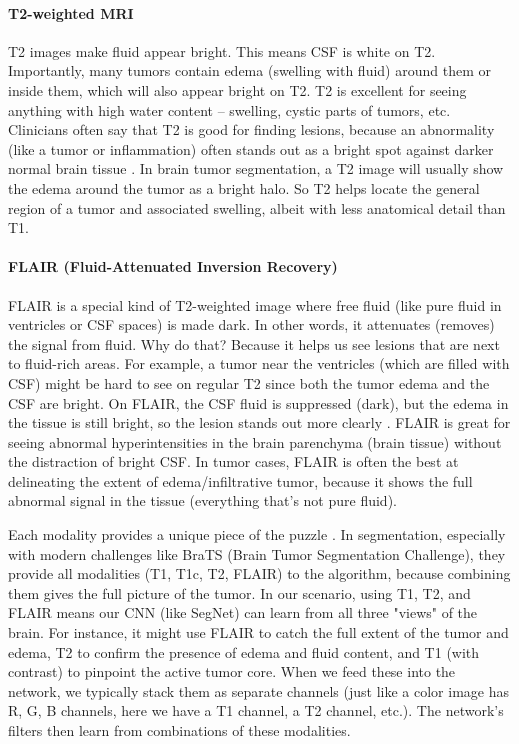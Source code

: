\paragraph{T2-weighted MRI}
T2 images make fluid appear bright. This means CSF is white on T2. Importantly, many tumors contain edema (swelling with fluid) around them or inside them, which will also appear bright on T2. T2 is excellent for seeing anything with high water content – swelling, cystic parts of tumors, etc. Clinicians often say that T2 is good for finding lesions, because an abnormality (like a tumor or inflammation) often stands out as a bright spot against darker normal brain tissue \cite{researchgate2023modalities}. In brain tumor segmentation, a T2 image will usually show the edema around the tumor as a bright halo. So T2 helps locate the general region of a tumor and associated swelling, albeit with less anatomical detail than T1.

\paragraph{FLAIR (Fluid-Attenuated Inversion Recovery)}
FLAIR is a special kind of T2-weighted image where free fluid (like pure fluid in ventricles or CSF spaces) is made dark. In other words, it attenuates (removes) the signal from fluid. Why do that? Because it helps us see lesions that are next to fluid-rich areas. For example, a tumor near the ventricles (which are filled with CSF) might be hard to see on regular T2 since both the tumor edema and the CSF are bright. On FLAIR, the CSF fluid is suppressed (dark), but the edema in the tissue is still bright, so the lesion stands out more clearly \cite{researchgate2023modalities}. FLAIR is great for seeing abnormal hyperintensities in the brain parenchyma (brain tissue) without the distraction of bright CSF. In tumor cases, FLAIR is often the best at delineating the extent of edema/infiltrative tumor, because it shows the full abnormal signal in the tissue (everything that's not pure fluid).

Each modality provides a unique piece of the puzzle \cite{nature2023mri}. In segmentation, especially with modern challenges like BraTS (Brain Tumor Segmentation Challenge), they provide all modalities (T1, T1c, T2, FLAIR) to the algorithm, because combining them gives the full picture of the tumor. In our scenario, using T1, T2, and FLAIR means our CNN (like SegNet) can learn from all three "views" of the brain. For instance, it might use FLAIR to catch the full extent of the tumor and edema, T2 to confirm the presence of edema and fluid content, and T1 (with contrast) to pinpoint the active tumor core. When we feed these into the network, we typically stack them as separate channels (just like a color image has R, G, B channels, here we have a T1 channel, a T2 channel, etc.). The network's filters then learn from combinations of these modalities.


